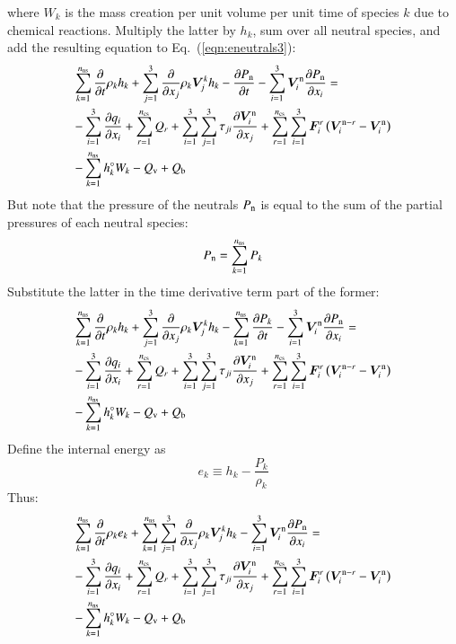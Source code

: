 \documentclass{warpdoc}
\newcommand{\alb}{\vspace{0.1cm}\\} %
\newcommand{\mfd}{\displaystyle}
\newcommand{\nns}{{n_{\rm ns}}}
\newcommand{\ncs}{{n_{\rm cs}}}
\renewcommand{\vec}[1]{\bm{#1}}
\begin{document}
%
where $W_k$ is the mass creation per unit volume per unit time of species $k$ due to chemical reactions. Multiply the latter by $h_k$, sum over all neutral species, and add the resulting equation to Eq.\ (\ref{eqn:eneutrals3}):
%
\begin{equation}
\begin{array}{l}\mfd
 \sum_{k=1}^\nns \frac{\partial }{\partial t}\rho_k h_k + \sum_{j=1}^3  \frac{\partial }{\partial x_j} \rho_k \vec{V}^k_j h_k 
- \frac{\partial P_{\rm n}}{\partial t} 
- \sum_{i=1}^3 \vec{V}^{\rm n}_i \frac{\partial P_{\rm n}}{\partial x_i}
=\alb\mfd 
-\sum_{i=1}^{3}\frac{\partial q_i}{\partial x_i}
+\sum_{r=1}^{\ncs} Q_{r}
+\sum_{i=1}^3 \sum_{j=1}^3 \tau_{ji} \frac{\partial \vec{V}_i^{\rm n}}{\partial x_j}
+ \sum_{r=1}^\ncs \sum_{i=1}^3 \vec{F}_i^{r} \left( \vec{V}_i^{{\rm n}-r}-\vec{V}_i^{\rm n} \right)
\alb\mfd
- \sum_{k=1}^\nns h_k^\circ W_k
-  Q_{\rm v}
+ Q_{\rm b}
\end{array}
\end{equation}
%  
But note that the pressure of the neutrals $P_{\rm n}$ is equal to the sum of the partial pressures of each neutral species:
%
\begin{equation}
P_{\rm n}=\sum_{k=1}^\nns P_k
\end{equation}
%
Substitute the latter in the time derivative term part of the former:
%
\begin{equation}
 \begin{array}{l}\mfd
 \sum_{k=1}^\nns \frac{\partial }{\partial t}\rho_k h_k + \sum_{j=1}^3  \frac{\partial }{\partial x_j} \rho_k \vec{V}^k_j h_k 
- \sum_{k=1}^\nns \frac{\partial P_k}{\partial t} 
- \sum_{i=1}^3 \vec{V}^{\rm n}_i \frac{\partial P_{\rm n}}{\partial x_i}
= \alb\mfd
-\sum_{i=1}^{3}\frac{\partial q_i}{\partial x_i}
+\sum_{r=1}^{\ncs} Q_{r}
+\sum_{i=1}^3 \sum_{j=1}^3 \tau_{ji} \frac{\partial \vec{V}_i^{\rm n}}{\partial x_j}
+ \sum_{r=1}^\ncs \sum_{i=1}^3 \vec{F}_i^{r} \left( \vec{V}_i^{{\rm n}-r}-\vec{V}_i^{\rm n} \right)\alb\mfd
- \sum_{k=1}^\nns h_k^\circ W_k
-  Q_{\rm v}
+ Q_{\rm b}
\end{array}
\end{equation}
%  
Define the internal energy as
%
\begin{equation}
e_k \equiv h_k-\frac{P_k}{\rho_k}
\end{equation}
%
Thus:
%
\begin{equation}
\begin{array}{l}\mfd
 \sum_{k=1}^\nns \frac{\partial }{\partial t}\rho_k e_k + \sum_{k=1}^\nns \sum_{j=1}^3  \frac{\partial }{\partial x_j} \rho_k \vec{V}^k_j h_k 
- \sum_{i=1}^3 \vec{V}^{\rm n}_i \frac{\partial P_{\rm n}}{\partial x_i}
= \alb\mfd
-\sum_{i=1}^{3}\frac{\partial q_i}{\partial x_i}
+\sum_{r=1}^{\ncs} Q_{r}
+\sum_{i=1}^3 \sum_{j=1}^3 \tau_{ji} \frac{\partial \vec{V}_i^{\rm n}}{\partial x_j}
+ \sum_{r=1}^\ncs \sum_{i=1}^3 \vec{F}_i^{r} \left( \vec{V}_i^{{\rm n}-r}-\vec{V}_i^{\rm n} \right)\alb\mfd
- \sum_{k=1}^\nns h_k^\circ W_k
-  Q_{\rm v}
+ Q_{\rm b}
\end{array}
\end{equation}
\end{document}
